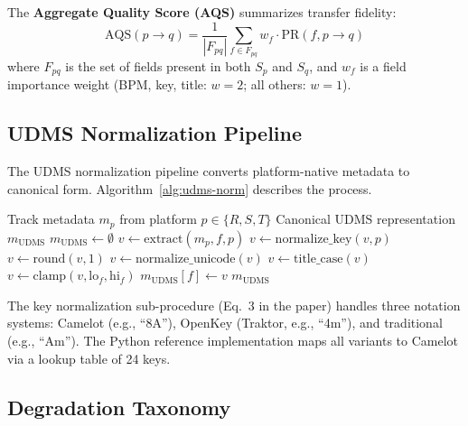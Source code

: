 The \textbf{Aggregate Quality Score (AQS)} summarizes transfer fidelity:
\begin{equation}
  \text{AQS}(p \to q) = \frac{1}{|F_{pq}|} \sum_{f \in F_{pq}} w_f \cdot \text{PR}(f, p \to q)
\end{equation}
where $F_{pq}$ is the set of fields present in both $S_p$ and $S_q$, and $w_f$ is a field importance weight (BPM, key, title: $w=2$; all others: $w=1$).

\subsection{UDMS Normalization Pipeline}

The UDMS normalization pipeline converts platform-native metadata to canonical form. Algorithm~\ref{alg:udms-norm} describes the process.

\begin{algorithm}[t]
\caption{UDMS Normalization Pipeline}
\label{alg:udms-norm}
\begin{algorithmic}[1]
\REQUIRE Track metadata $m_p$ from platform $p \in \{R, S, T\}$
\ENSURE Canonical UDMS representation $m_{\text{UDMS}}$
\STATE $m_{\text{UDMS}} \gets \emptyset$
  \STATE $v \gets \text{extract}(m_p, f, p)$ 
    \STATE $v \gets \text{normalize\_key}(v, p)$ 
    \STATE $v \gets \text{round}(v, 1)$ 
    \STATE $v \gets \text{normalize\_unicode}(v)$
    \STATE $v \gets \text{title\_case}(v)$
    \STATE $v \gets \text{clamp}(v, \text{lo}_f, \text{hi}_f)$
  \ENDIF
  \STATE $m_{\text{UDMS}}[f] \gets v$
\ENDFOR
\RETURN $m_{\text{UDMS}}$
\end{algorithmic}
\end{algorithm}

The key normalization sub-procedure (Eq.~3 in the paper) handles three notation systems: Camelot (e.g., ``8A''), OpenKey (Traktor, e.g., ``4m''), and traditional (e.g., ``Am''). The Python reference implementation maps all variants to Camelot via a lookup table of 24 keys.

\subsection{Degradation Taxonomy}

